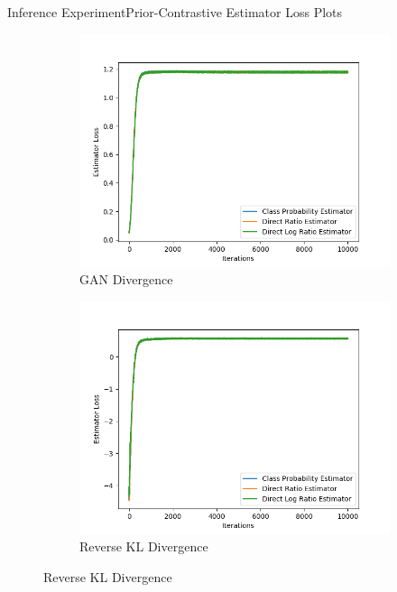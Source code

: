 \documentclass{beamer}
\begin{document}
\begin{frame}{Inference Experiment}{Prior-Contrastive Estimator Loss Plots}
\begin{figure}
\begin{subfigure}{0.49\textwidth}
\includegraphics[width=\linewidth]{estimator_losses/PCADVvsPCADVexpvsPCADVgudlog.png}
\caption{GAN Divergence}
\end{subfigure}
\begin{subfigure}{0.49\textwidth}
\includegraphics[width=\linewidth]{estimator_losses/PCKLDvsPCKLexpvsPCKLgudlog.png}
\caption{Reverse KL Divergence}
\end{subfigure}
\end{figure}
\end{frame}
\end{document}
